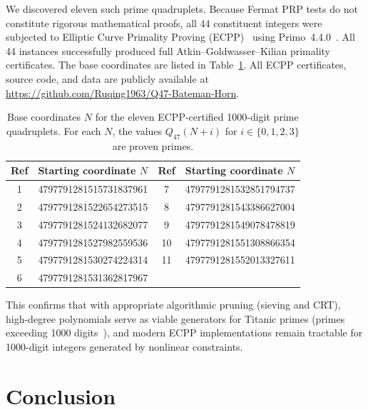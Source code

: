 \documentclass[11pt, a4paper]{article}
\begin{document}
We discovered eleven such prime quadruplets. Because Fermat PRP tests do not constitute rigorous mathematical proofs, all 44 constituent integers were subjected to Elliptic Curve Primality Proving (ECPP)~\cite{atkin-morain} using Primo~4.4.0~\cite{primo}. All 44 instances successfully produced full Atkin--Goldwasser--Kilian primality certificates. The base coordinates are listed in Table~\ref{tab:titanic}. All ECPP certificates, source code, and data are publicly available at \url{https://github.com/Ruqing1963/Q47-Bateman-Horn}.

\begin{table}[H]
\centering
\caption{Base coordinates $N$ for the eleven ECPP-certified 1000-digit prime quadruplets. For each $N$, the values $Q_{47}(N+i)$ for $i \in \{0,1,2,3\}$ are proven primes.}
\label{tab:titanic}
\small
\begin{tabular}{cl|cl}
\toprule
\textbf{Ref} & \textbf{Starting coordinate $N$} & \textbf{Ref} & \textbf{Starting coordinate $N$}\\
\midrule
1 & \num{4797791281515731837961} & 7 & \num{4797791281532851794737} \\
2 & \num{4797791281522654273515} & 8 & \num{4797791281543386627004} \\
3 & \num{4797791281524132682077} & 9 & \num{4797791281549078478819} \\
4 & \num{4797791281527982559536} & 10 & \num{4797791281551308866354} \\
5 & \num{4797791281530274224314} & 11 & \num{4797791281552013327611} \\
6 & \num{4797791281531362817967} & & \\
\bottomrule
\end{tabular}
\end{table}

This confirms that with appropriate algorithmic pruning (sieving and CRT), high-degree polynomials serve as viable generators for Titanic primes (primes exceeding 1000 digits~\cite{caldwell}), and modern ECPP implementations remain tractable for 1000-digit integers generated by nonlinear constraints.

\section{Conclusion}
\end{document}
